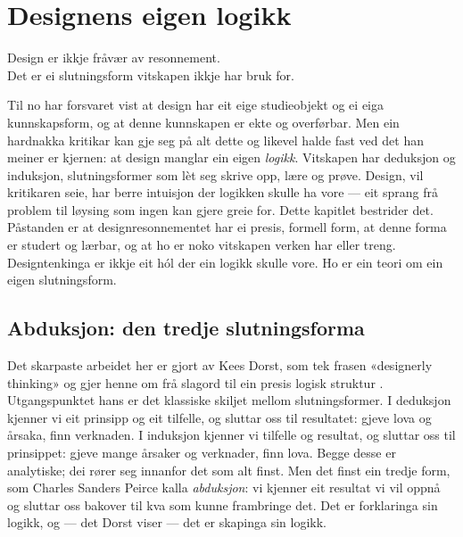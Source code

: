 \chapter{Designens eigen logikk}

\begin{motto}
Design er ikkje fråvær av resonnement.\\ Det er ei slutningsform vitskapen ikkje har bruk for.
\end{motto}

Til no har forsvaret vist at design har eit eige studieobjekt og ei eiga kunnskapsform, og at denne kunnskapen er ekte og overførbar. Men ein hardnakka kritikar kan gje seg på alt dette og likevel halde fast ved det han meiner er kjernen: at design manglar ein eigen \emph{logikk}. Vitskapen har deduksjon og induksjon, slutningsformer som lèt seg skrive opp, lære og prøve. Design, vil kritikaren seie, har berre intuisjon der logikken skulle ha vore — eit sprang frå problem til løysing som ingen kan gjere greie for. Dette kapitlet bestrider det. Påstanden er at designresonnementet har ei presis, formell form, at denne forma er studert og lærbar, og at ho er noko vitskapen verken har eller treng. Designtenkinga er ikkje eit hól der ein logikk skulle vore. Ho er ein teori om ein eigen slutningsform.

\section{Abduksjon: den tredje slutningsforma}

Det skarpaste arbeidet her er gjort av Kees Dorst, som tek frasen «designerly thinking» og gjer henne om frå slagord til ein presis logisk struktur \autocite{dorst2011core}. Utgangspunktet hans er det klassiske skiljet mellom slutningsformer. I deduksjon kjenner vi eit prinsipp og eit tilfelle, og sluttar oss til resultatet: gjeve lova og årsaka, finn verknaden. I induksjon kjenner vi tilfelle og resultat, og sluttar oss til prinsippet: gjeve mange årsaker og verknader, finn lova. Begge desse er analytiske; dei rører seg innanfor det som alt finst. Men det finst ein tredje form, som Charles Sanders Peirce kalla \emph{abduksjon}: vi kjenner eit resultat vi vil oppnå og sluttar oss bakover til kva som kunne frambringe det. Det er forklaringa sin logikk, og — det Dorst viser — det er skapinga sin logikk.


